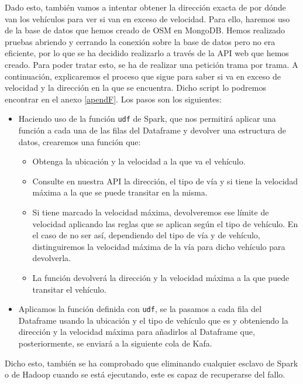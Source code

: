 Dado esto, también vamos a intentar obtener la dirección exacta de por dónde van los vehículos para ver si van en exceso de velocidad. Para ello, haremos uso de la base de datos que hemos creado de OSM en MongoDB. Hemos realizado pruebas abriendo y cerrando la conexión sobre la base de datos pero no era eficiente, por lo que se ha decidido realizarlo a través de la API web que hemos creado. Para poder tratar esto, se ha de realizar una petición trama por trama. A continuación, explicaremos el proceso que sigue para saber si va en exceso de velocidad y la dirección en la que se encuentra. Dicho script lo podremos encontrar en el anexo \ref{apendF}. Los pasos son los siguientes:

\begin{itemize}
        \item Haciendo uso de la función {\tt udf} de Spark, que nos permitirá aplicar una función a cada una de las filas del Dataframe y devolver una estructura de datos, crearemos una función que:
        \begin{itemize}
                \item Obtenga la ubicación y la velocidad a la que va el vehículo.
                \item Consulte en nuestra API la dirección, el tipo de vía y si tiene la velocidad máxima a la que se puede transitar en la misma.
                \item Si tiene marcado la velocidad máxima, devolveremos ese límite de velocidad aplicando las reglas que se aplican según el tipo de vehículo. En el caso de no ser así, dependiendo del tipo de vía y de vehículo, distinguiremos la velocidad máxima de la vía para dicho vehículo para devolverla.
                \item La función devolverá la dirección y la velocidad máxima a la que puede transitar el vehículo.
        \end{itemize}
        \item Aplicamos la función definida con {\tt udf}, se la pasamos a cada fila del Dataframe usando la ubicación y el tipo de vehículo que es y obteniendo la dirección y la velocidad máxima para añadirlos al Dataframe que, posteriormente, se enviará a la siguiente cola de Kafa.
\end{itemize}

Dicho esto, también se ha comprobado que eliminando cualquier esclavo de Spark o de Hadoop cuando se está ejecutando, este es capaz de recuperarse del fallo.

